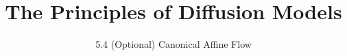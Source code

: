 
\title{The Principles of Diffusion Models}
\subtitle{5.4 (Optional) Canonical Affine Flow}


\begin{frame}
    \titlepage
\end{frame}


